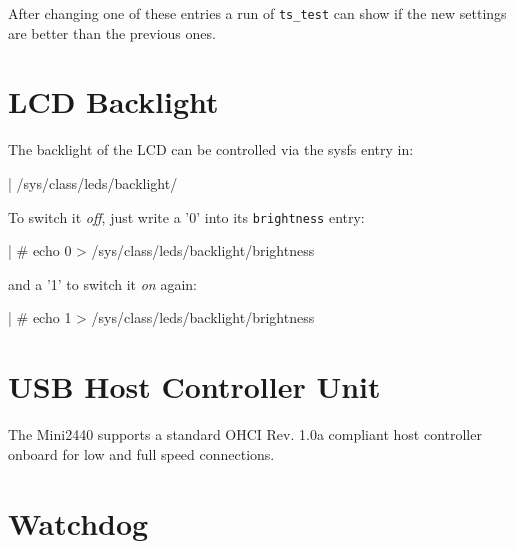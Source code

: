 After changing one of these entries a run of \texttt{ts\_test} can show if the
new settings are better than the previous ones.


\section{LCD Backlight}				\label{sec:BLIGHT}

The backlight of the LCD can be controlled via the sysfs entry in:

\begin{ptxshell}{|}
/sys/class/leds/backlight/
\end{ptxshell}

To switch it \textit{off}, just write a '0' into its \texttt{brightness} entry:

\begin{ptxshell}{|}
# echo 0 > /sys/class/leds/backlight/brightness
\end{ptxshell}

and a '1' to switch it \textit{on} again:

\begin{ptxshell}{|}
# echo 1 > /sys/class/leds/backlight/brightness
\end{ptxshell}


\section{USB Host Controller Unit}			\label{sec:USBHOST}

The Mini2440 supports a standard OHCI Rev. 1.0a compliant host controller
onboard for low and full speed connections.

%
%


\newcommand{\perWatchdogTimeout}{15}

\section{Watchdog}			\label{sec:WD}

